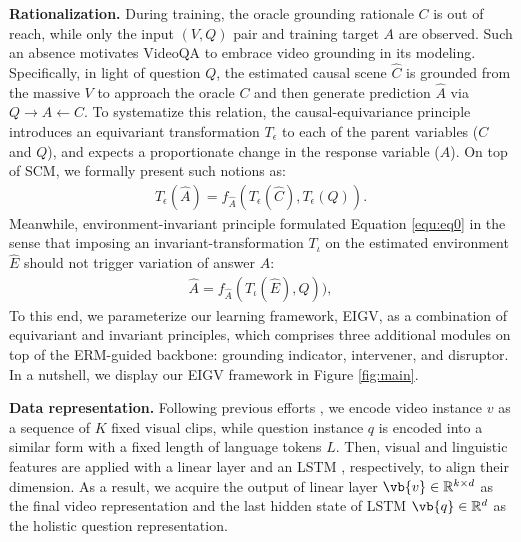 \vspace{5pt}
\noindent\textbf{Rationalization.} 
During training, the oracle grounding rationale $C$ is out of reach, while only the input $(V, Q)$ pair and training target $A$ are observed. 
Such an absence motivates VideoQA to embrace video grounding in its modeling. 
Specifically, in light of question $Q$, the estimated causal scene $\hat{C}$ is grounded from the massive $V$ to approach the oracle $C$ and then generate prediction $\hat{A}$ via $Q \rightarrow A \leftarrow C$. 
To systematize this relation, the causal-equivariance principle introduces an equivariant transformation $T_\epsilon$ to each of the parent variables (\ie $C$ and $Q$), and expects a proportionate change in the response variable (\ie $A$). On top of SCM, we formally present such notions as:
\begin{gather}
    T_\epsilon(\hat{A})=f_{\hat{A}}(T_\epsilon(\hat{C}),T_\epsilon(Q)). \label{equ:equivariance}
\end{gather}
Meanwhile, environment-invariant principle formulated Equation \eqref{equ:eq0} in the sense that imposing an invariant-transformation $T_\iota$ on the estimated environment $\hat{E}$ should not trigger variation of answer $A$: 
\begin{gather}
      \hat{A}=f_{\hat{A}}(T_\iota(\hat{E}),Q)),\label{equ:invariance}
\end{gather} 
To this end, we parameterize our learning framework, EIGV, as a combination of equivariant and invariant principles, which comprises three additional modules on top of the ERM-guided backbone: grounding indicator, intervener, and disruptor. In a nutshell, we display our EIGV framework in Figure \ref{fig:main}.


\vspace{5pt}
\noindent \textbf{Data representation.}
Following previous efforts \cite{jiang2020reasoning, DBLP:conf/acl/GuoZJ0L20}, we encode video instance $v$ as a sequence of $K$ fixed visual clips, while question instance $q$ is encoded into a similar form with a fixed length of language tokens $L$.
Then, visual and linguistic features are applied with a linear layer and an LSTM \cite{10.1162/neco.1997.9.8.1735}, respectively, to align their dimension. As a result, we acquire the output of linear layer $ \vb{v} \in \mathbb{R}^{k \times d}$ as the final video representation and the last hidden state of LSTM $\vb{q} \in \mathbb{R}^{d}$ as the holistic question representation.


